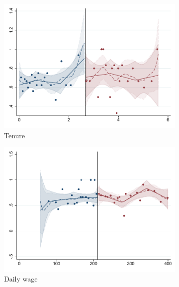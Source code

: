 \documentclass[oneside,11pt]{article}
\begin{document}
\begin{figure}[H]
     \caption{RD plots (Calculator + letter treatment)}
    \label{rd_t3}
\begin{center}
\begin{subfigure}{0.31\textwidth}

\caption{Tenure}
        \includegraphics[width=\textwidth]{Figuras/rdplot_conflicto_arreglado_tenure_3.pdf}
    \end{subfigure}
    \begin{subfigure}{0.31\textwidth}
\caption{Daily wage}
        \includegraphics[width=\textwidth]{Figuras/rdplot_conflicto_arreglado_dw_3.pdf}
    \end{subfigure}        
    \begin{subfigure}{0.31\textwidth}

\end{subfigure}
\end{center}
\end{figure}
\end{document}
